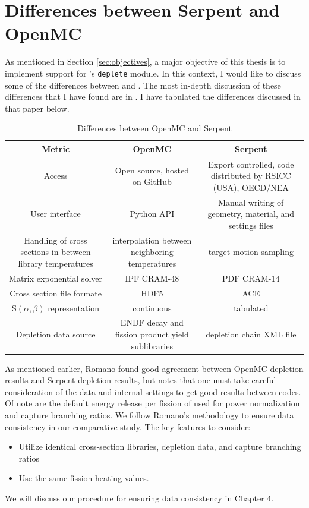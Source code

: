 \section{Differences between Serpent and OpenMC}
As mentioned in Section \ref{sec:objectives}, a major objective of this thesis
is to implement support for \OpenMC's \verb.deplete. module. In this context,
I would like to discuss some of the differences between \OpenMC and \SerpentTWO.
The most in-depth discussion of these differences that I have found are in
\cite{romano_depletion_2021}. I have tabulated the differences discussed in that
paper below.
\begin{table}[htpb] 
    \centering 
    \caption{Differences between OpenMC and Serpent} 
    \label{tab:mc_code_diffs}
    \begin{tabulary}{\linewidth}{|C|C|C|} 
        \hline
        Metric & OpenMC & Serpent \\ 
        \hline 
        Access & Open source, hosted on GitHub & Export controlled, code distributed by RSICC (USA), OECD/NEA\\
        \hline
        User interface & Python API & Manual writing of geometry, material, and settings files\\
        \hline 
        Handling of cross sections in between library temperatures & interpolation between neighboring temperatures & target motion-sampling \cite{viitanen_explicit_2012}\\
        \hline 
        Matrix exponential solver & IPF CRAM-48 & PDF CRAM-14 \\
        \hline
        Cross section file formate & HDF5 & ACE \\
        \hline
        S$(\alpha, \beta)$ representation & continuous & tabulated \\
        \hline
        Depletion data source & ENDF decay and fission product yield sublibraries & depletion chain XML file\\
        \hline
    \end{tabulary}
\end{table}
As mentioned earlier, Romano found good agreement between OpenMC depletion
results and Serpent depletion results, but notes that one must take careful
consideration of the data and internal settings to get good results between
codes. Of note are the default energy release per fission of 
used for power normalization and capture branching ratios. We follow
Romano's methodology to ensure data consistency in our comparative study. The key
features to consider:
\begin{itemize}
    \item Utilize identical cross-section libraries, depletion data, and capture branching ratios
    \item Use the same fission heating values.
\end{itemize}
We will discuss our procedure for ensuring data consistency in Chapter 4.
